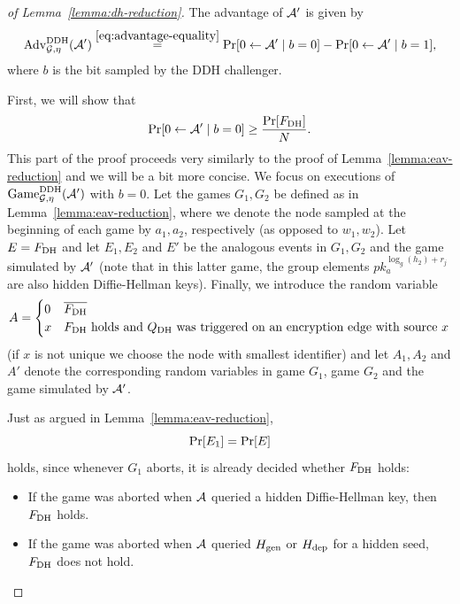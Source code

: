 \begin{proof}[of Lemma~\ref{lemma:dh-reduction}]
	The advantage of $\mathcal{A}'$ is given by
	\begin{equation} \label{eq:lemma-dh-reduction-advantage}
		\advantage{\mathcal{G}}{\eta}{DDH}(\adv') \stackrel{\eqref{eq:advantage-equality}}{=} \pr{0 \from \adv' \mid b = 0} - \pr{0 \from \adv' \mid b = 1},
	\end{equation}
	where $b$ is the bit sampled by the DDH challenger.

	First, we will show that
	\begin{equation} \label{eq:lemma-dh-reduction-b=0}
		\pr{0 \from \adv' \mid b = 0} \ge \frac{\pr{\fdh}}{N}.
	\end{equation}
	This part of the proof proceeds very similarly to the proof of Lemma~\vref{lemma:eav-reduction} and we will be a bit more concise. We focus on executions of $\mathrm{Game}_{\mathcal{G}, \eta}^{\mathrm{DDH}}(\mathcal{A}')$ with $b = 0$. Let the games $G_1, G_2$ be defined as in Lemma~\ref{lemma:eav-reduction}, where we denote the node sampled at the beginning of each game by $a_1, a_2$, respectively (as opposed to $w_1, w_2$). Let $E = F_\mathrm{DH}$ and let $E_1, E_2$ and $E'$ be the analogous events in $G_1, G_2$ and the game simulated by $\mathcal{A}'$ (note that in this latter game, the group elements $pk_a^{\log_g(h_2) + r_j}$ are also hidden Diffie-Hellman keys). Finally, we introduce the random variable
	\[
		A = \begin{cases}
			0 & \overline{F_\mathrm{DH}}                                                                    \\
			x & \text{$F_\mathrm{DH}$ holds and $Q_\mathrm{DH}$ was triggered on an encryption edge with source $x$}
		\end{cases}
	\]
	(if $x$ is not unique we choose the node with smallest identifier) and let $A_1, A_2$ and $A'$ denote the corresponding random variables in game $G_1$, game $G_2$ and the game simulated by $\mathcal{A}'$.

	Just as argued in Lemma~\ref{lemma:eav-reduction},
	\begin{equation} \label{eq:lemma-dh-reduction-E=E_1}
		\pr{E_1} = \pr{E}
	\end{equation}
	holds, since whenever $G_1$ aborts, it is already decided whether $F_\mathrm{DH}$ holds:
	\begin{itemize}
		\item If the game was aborted when $\mathcal{A}$ queried a hidden Diffie-Hellman key, then $F_\mathrm{DH}$ holds.
		\item If the game was aborted when $\mathcal{A}$ queried $H_\mathrm{gen}$ or $H_\mathrm{dep}$ for a hidden seed, $F_\mathrm{DH}$ does not hold.
	\end{itemize}


\end{proof}
